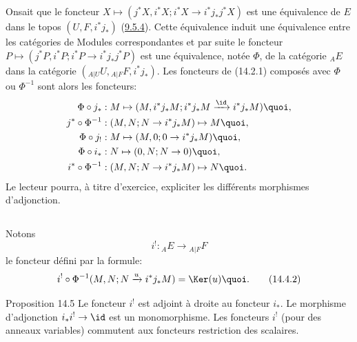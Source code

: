 \documentclass[10pt]{../fichiers-configuration-latex/smfart}
\begin{document}
\subsection{}
On\pageoriginale sait que le foncteur $X\mapsto (j^{\ast}X,
i^{\ast}X; i^{\ast}X\rightarrow i^{\ast}j_{\ast}j^{\ast}X)$ est une
équivalence de $E$ dans le topos $(U,F, i^{\ast}j_{\ast})$
(\hyperref[IV.theo9.5.4]{9.5.4}). Cette équivalence induit une équivalence entre
les catégories de Modules correspondantes et par suite le foncteur
$P\mapsto (j^{\ast}P, i^{\ast}P; i^{\ast}P\rightarrow
i^{\ast}j_{\ast}j^{\ast}P)$ est une équivalence, notée $\Phi$, de la
catégorie ${}_AE$ dans la catégorie $({}_{A| U}U, {}_{A| F}F,
i^{\ast}j_{\ast})$. Les foncteurs de (14.2.1) composés avec $\Phi$
ou $\Phi^{-1}$ sont alors les foncteurs:
\begin{align*}
\Phi\circ j_{\ast} &: M\mapsto (M,i^{\ast} j_{\ast}M;
i^{\ast}j_{\ast}M\xrightarrow{\id} i^{\ast}j_{\ast}M){\quoi},\\
j^{\ast}\circ \Phi^{-1} &: (M,N; N\rightarrow
i^{\ast}j_{\ast}M)\mapsto M{\quoi},\\
\Phi\circ j_{!} &: M\mapsto (M,0;0\rightarrow i^{\ast}
j_{\ast}M){\quoi},\\
\Phi\circ i_{\ast} &: N\mapsto (0,N;N\rightarrow 0){\quoi},\\
i^{\ast}\circ \Phi^{-1} &: (M,N;N\rightarrow
i^{\ast}j_{\ast}M)\mapsto N{\quoi}.
\end{align*}
Le lecteur pourra, à titre d'exercice, expliciter les différents
morphismes d'adjonction.

\subsection{}
Notons
\begin{equation*}
i^{!}:{}_AE\longrightarrow {}_{A| F}F\tag{14.4.1}
\end{equation*}
le foncteur défini par la formule:
\begin{equation*}
i^{!}\circ
\Phi^{-1}(M,N;N\xrightarrow{u}i^{\ast}j_{\ast}M)=\Ker(u){\quoi}.\tag{14.4.2}
\end{equation*}

\begin{enonce*}{Proposition 14.5}
Le foncteur $i^{!}$ est adjoint à droite au foncteur $i_{\ast}$. Le
morphisme d'adjonction $i_{\ast}i^{!}\rightarrow \id$ est un
monomorphisme. Les foncteurs $i^{!}$ (pour des anneaux variables)
commutent aux foncteurs restriction des scalaires.
\end{enonce*}
\end{document}
